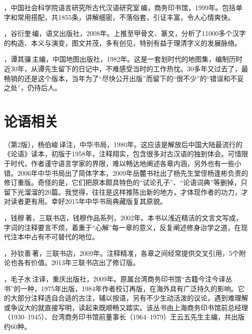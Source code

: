 ，中国社会科学院语言研究所古代汉语研究室\,编，商务印书馆，1999年。包括单字和常用搭配，共1855条，讲解细密，不落俗套，引证丰富，令人心情爽快。

，谷衍奎\,编，语文出版社，2008年。上推至甲骨文、篆文，分析了11000多个汉字的构造、本义与演变，图文并茂，多有创见，特别有益于理清字义的发展脉络。

，谭其骧\,主编，中国地图出版社，1982年。这是一套划时代的地图集，编制历时近30年，从谭先生留下的日记中，不难感受当时的工作热忱。30多年又过去了，最畅销的还是这个版本，当年为了“尽快公开出版”而留下的“很不少”的“错误和不妥之处”，仍待后人。


\lypdfbookmark\section*{论语相关}

（第2版），杨伯峻\,译注，中华书局，1980年。这应该是解放后中国大陆最流行的《论语》读本，初版于1958年，注释翔实，包含很多对古汉语的独到体会。可惜限于时代，作者谨守语言学家的界限，难以畅达地阐述各章内涵，另外也有一些小错。2006年中华书局出了简体字本，2009年岳麓书社出了杨先生堂侄杨逢彬负责的修订重版。奇怪的是，它们把原本颇具特色的“试论孔子”、“论语词典”等删掉，只留下光溜溜的20篇。我觉得，往往是这样推陈出新的地方，才体现作者的功力，才对读者更有用。幸好2015年中华书局典藏版复其原貌。

，钱穆\,著，三联书店，钱穆作品系列，2002年。本书以浅近精洁的文言文写成，字词的注释要言不烦，着重于“心解”每一章的意义，反复阐述修身治学之道，在现代注本中占有不可替代的地位。

，孙钦善\,著，三联书店，2009年。注释精准，各章之间经常提供交叉引用，5个附论也各有价值。2013年三联书店出了修订版。

，毛子水\,注译，重庆出版社，2009年。原属台湾商务印书馆“古籍今注今译丛书”的一种，1975年出版，1984年作者校订再版，在海外具有广泛持久的影响。它的大部分注释选自合适的古注，辅以按语，另有不少生动活泼的议论，遇到难理解或争议大的就直接写明，读起来既顺畅又踏实。该丛书由上海商务印书馆前总经理（1930--1945）、台湾商务印书馆前董事长（1964--1979）王云五先生主编，共出版约60种。


